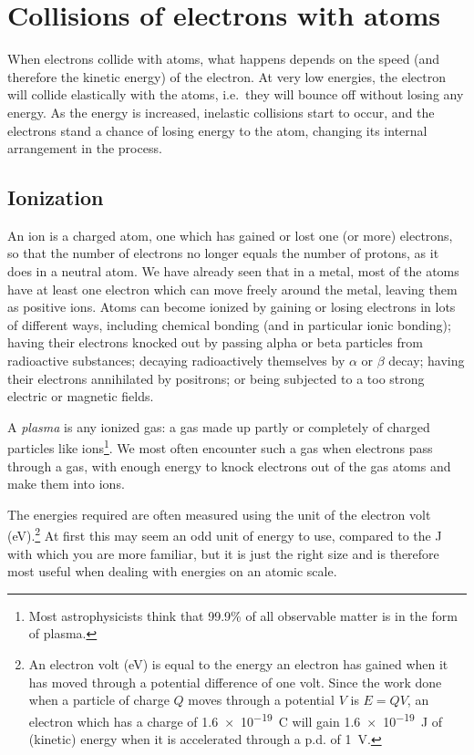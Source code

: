 
\section{Collisions of electrons with atoms}

When electrons collide with atoms, what happens depends on the speed (and therefore the kinetic energy) of the electron.  At very low energies, the electron will collide elastically with the atoms, i.e.\ they will bounce off without losing any energy.  As the energy is increased, inelastic collisions start to occur, and the electrons stand a chance of losing energy to the atom, changing its internal arrangement in the process.

\subsection{Ionization}

An ion is a charged atom, one which has gained or lost one (or more) electrons, so that the number of electrons no longer equals the number of protons, as it does in a neutral atom.  We have already seen that in a metal, most of the atoms have at least one electron which can move freely around the metal, leaving them as positive ions.  Atoms can become ionized by gaining or losing electrons in lots of different ways, including chemical bonding (and in particular ionic bonding); having their electrons knocked out by passing alpha or beta particles from radioactive substances; decaying radioactively themselves by $\alpha$ or $\beta$ decay; having their electrons annihilated by positrons; or being subjected to a too strong electric or magnetic fields.

A \emph{plasma} is any ionized gas: a gas made up partly or completely of charged particles like ions\footnote{Most astrophysicists think that 99.9\% of all observable matter is in the form of plasma.}.  We most often encounter such a gas when electrons pass through a gas, with enough energy to knock electrons out of the gas atoms and make them into ions.

The energies required are often measured using the unit of the electron volt (\si{eV}).\footnote{An electron volt (\si{eV}) is equal to the energy an electron has gained when it has moved through a potential difference of one volt.  Since the work done when a particle of charge $Q$ moves through a potential $V$ is $E=QV$, an electron which has a charge of \SI{1.6e-19}{C} will gain \SI{1.6e-19}{J} of (kinetic) energy when it is accelerated through a p.d. of \SI{1}{V}.}  At first this may seem an odd unit of energy to use, compared to the \si{J} with which you are more familiar, but it is just the right size and is therefore most useful when dealing with energies on an atomic scale.

